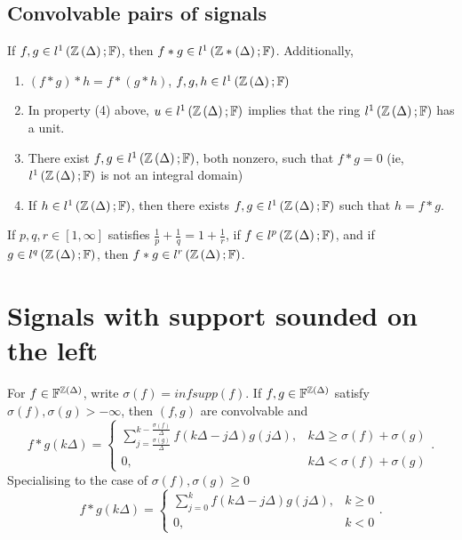 \subsection{Convolvable pairs of signals}
\begin{theorem}
	If $f, g \in  l^{1}\left( \mathbb{Z}\left( \Delta \right) ; \mathbb{F} \right) $, then $f * g \in  l ^{1}\left( \mathbb{Z}*\left( \Delta \right) ; \mathbb{F} \right) $. Additionally, 
	\begin{enumerate}
		\item  $\left( f * g \right) * h = f * \left( g * h \right) $, $f,g, h \in l^{1}\left( \mathbb{Z}\left( \Delta \right); \mathbb{F}  \right) $ 
		\item In property (4) above, $u \in  l ^{1}\left( \mathbb{Z}\left( \Delta \right) ; \mathbb{F} \right) $ implies that the ring $l^{1}\left( \mathbb{Z}\left( \Delta \right) ; \mathbb{F} \right) $ has a unit.
		\item There exist $f, g \in  l ^{1}\left( \mathbb{Z}\left( \Delta \right) ; \mathbb{F} \right) $, both nonzero, such that $f * g = 0 $ (ie, $ l ^{1}\left( \mathbb{Z}\left( \Delta \right) ; \mathbb{F} \right)$ is not an integral domain)
		\item If $h \in  l^{1}\left( \mathbb{Z}\left( \Delta \right) ; \mathbb{F} \right) $, then there exists $f, g \in   l ^{1}\left( \mathbb{Z}\left( \Delta \right) ; \mathbb{F} \right)$ such that $h = f * g $. 
	\end{enumerate}
\end{theorem}
\begin{theorem}
	If $p, q, r \in  \left[ 1, \infty \right] $ satisfies $\frac{1}{p} + \frac{1}{q} = 1 + \frac{1}{r}$, if $f \in  l^{p}\left( \mathbb{Z}\left( \Delta \right) ; \mathbb{F} \right) $, and if $g \in  l^{q}\left( \mathbb{Z}\left( \Delta \right) ; \mathbb{F} \right) $, then $f * g \in  l^{r}\left( \mathbb{Z}\left( \Delta \right) ; \mathbb{F} \right)$. 
\end{theorem}
\section{Signals with support sounded on the left}

For $f \in  \mathbb{F}^{\mathbb{Z}\left( \Delta \right) }$, write $\sigma \left( f \right) = inf supp\left( f \right) $. If $f, g \in  \mathbb{F}^{\mathbb{Z}\left( \Delta \right) }$ satisfy $\sigma \left( f \right) , \sigma \left( g \right) > -\infty$, then $\left( f, g \right) $ are convolvable and
\[
	f * g \left( k \Delta \right) = \begin{cases}
		\sum_{j =  \frac{ \sigma \left( g \right)   }{\Delta} }^{k - \frac{\sigma\left( f \right) }{\Delta}} f \left( k \Delta - j \Delta \right) g \left( j \Delta \right),  & k \Delta \ge  \sigma \left( f \right) + \sigma \left( g  \right) \\
		0, & k \Delta <  \sigma \left( f \right) + \sigma \left( g  \right) 
	\end{cases}
.\]
Specialising to the case of $\sigma \left( f  \right) , \sigma\left( g  \right) \ge  0$ 
\[
	f * g \left( k \Delta \right) = \begin{cases}
		\sum_{j =  0 }^{k} f \left( k \Delta - j \Delta \right) g \left( j \Delta \right),  & k  \ge  0\\
		0, & k < 0

	\end{cases}
.\] 

